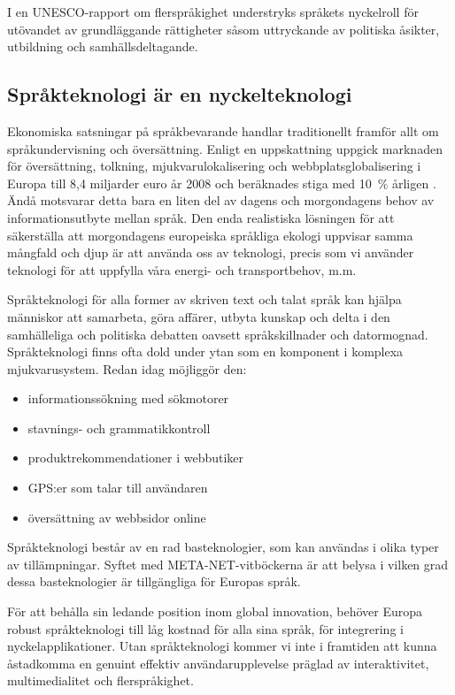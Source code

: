 \begin{multicols}{2}
I en UNESCO-rapport om flerspråkighet understryks språkets nyckelroll
för utövandet av grundläggande rättigheter såsom uttryckande av
politiska åsikter, utbildning och samhällsdeltagande.


\subsection{Språkteknologi är en nyckelteknologi}

Ekonomiska satsningar på språkbevarande handlar traditionellt framför
allt om språkundervisning och översättning. Enligt en uppskattning
uppgick marknaden för översättning, tolkning, mjukvarulokalisering och
webbplatsglobalisering i Europa till 8,4 miljarder euro år 2008 och
beräknades stiga med 10~\% årligen \cite{EC3}. Ändå motsvarar detta
bara en liten del av dagens och morgon\-dagens behov av
informations\-utbyte mellan språk. Den enda realistiska lösningen för
att säkerställa att morgondagens europeiska språkliga ekologi uppvisar
samma mångfald och djup är att använda oss av teknologi, precis som vi
använder teknologi för att uppfylla våra energi- och transport\-behov,
m.m.

Språkteknologi för alla former av skriven text och talat språk kan
hjälpa människor att samarbeta, göra affärer, utbyta kunskap och delta
i den samhälleliga och politiska debatten oavsett språkskillnader och
datormognad. Språkteknologi finns ofta dold under ytan som en
komponent i komplexa mjuk\-varu\-system. Redan idag möjliggör den:

\begin{itemize}[itemsep=0pt,parsep=0pt]
\item informationssökning med sökmotorer
\item stavnings- och grammatikkontroll
\item produktrekommendationer i webbutiker
\item GPS:er som talar till användaren
\item översättning av webbsidor online
\end{itemize}

Språkteknologi består av en rad basteknologier, som kan användas i
olika typer av tillämpningar. Syftet med META-NET-vitböckerna är att
belysa i vilken grad dessa basteknologier är tillgängliga för Europas
språk.


För att behålla sin ledande position inom global innovation, behöver
Europa robust språkteknologi till låg kostnad för alla sina språk, för
integrering i nyckelapplikationer. Utan språkteknologi kommer vi inte
i framtiden att kunna åstadkomma en genuint effektiv
användar\-upp\-levelse präglad av interaktivitet, multimedialitet och
flerspråkighet.



\end{multicols}
